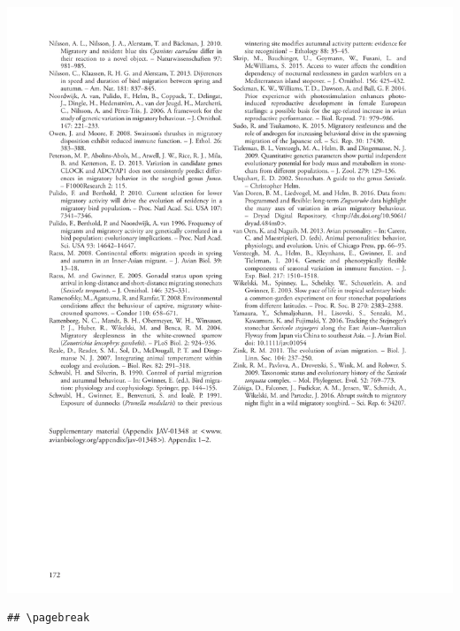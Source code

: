 \documentclass[a4paper, twoside]{templates/ociamthesis}
\begin{document}
\begin{center}\includegraphics[width=1\linewidth]{pdf_chapters/zug/zug_crop_Part18} \end{center}

\begin{verbatim}
## \pagebreak
\end{verbatim}
\end{document}
